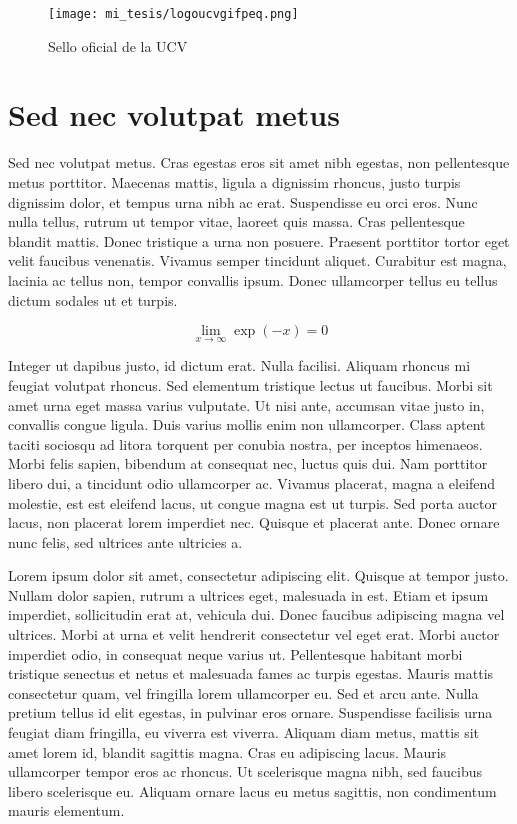 \begin{figure}
\begin{center}
\texttt{[image: mi\_tesis/logoucvgifpeq.png]}
\caption{Sello oficial de la UCV \label{selloUCV}}
\end{center}
\end{figure}

\section{Sed nec volutpat metus}
Sed nec volutpat metus. Cras egestas eros sit amet nibh egestas, non pellentesque metus porttitor. Maecenas mattis, ligula a dignissim rhoncus, justo turpis dignissim dolor, et tempus urna nibh ac erat. Suspendisse eu orci eros. Nunc nulla tellus, rutrum ut tempor vitae, laoreet quis massa. Cras pellentesque blandit mattis. Donec tristique a urna non posuere. Praesent porttitor tortor eget velit faucibus venenatis. Vivamus semper tincidunt aliquet. Curabitur est magna, lacinia ac tellus non, tempor convallis ipsum. Donec ullamcorper tellus eu tellus dictum sodales ut et turpis.

\begin{equation}
	\lim_{x \to \infty} \exp(-x) = 0
\end{equation}

Integer ut dapibus justo, id dictum erat. Nulla facilisi. Aliquam rhoncus mi feugiat volutpat rhoncus. Sed elementum tristique lectus ut faucibus. Morbi sit amet urna eget massa varius vulputate. Ut nisi ante, accumsan vitae justo in, convallis congue ligula. Duis varius mollis enim non ullamcorper. Class aptent taciti sociosqu ad litora torquent per conubia nostra, per inceptos himenaeos. Morbi felis sapien, bibendum at consequat nec, luctus quis dui. Nam porttitor libero dui, a tincidunt odio ullamcorper ac. Vivamus placerat, magna a eleifend molestie, est est eleifend lacus, ut congue magna est ut turpis. Sed porta auctor lacus, non placerat lorem imperdiet nec. Quisque et placerat ante. Donec ornare nunc felis, sed ultrices ante ultricies a. 

Lorem ipsum dolor sit amet, consectetur adipiscing elit. Quisque at tempor justo. Nullam dolor sapien, rutrum a ultrices eget, malesuada in est. Etiam et ipsum imperdiet, sollicitudin erat at, vehicula dui. Donec faucibus adipiscing magna vel ultrices. Morbi at urna et velit hendrerit consectetur vel eget erat. Morbi auctor imperdiet odio, in consequat neque varius ut. Pellentesque habitant morbi tristique senectus et netus et malesuada fames ac turpis egestas. Mauris mattis consectetur quam, vel fringilla lorem ullamcorper eu. Sed et arcu ante. Nulla pretium tellus id elit egestas, in pulvinar eros ornare. Suspendisse facilisis urna feugiat diam fringilla, eu viverra est viverra. Aliquam diam metus, mattis sit amet lorem id, blandit sagittis magna. Cras eu adipiscing lacus. Mauris ullamcorper tempor eros ac rhoncus. Ut scelerisque magna nibh, sed faucibus libero scelerisque eu. Aliquam ornare lacus eu metus sagittis, non condimentum mauris elementum.

